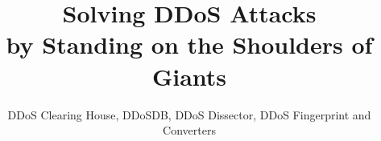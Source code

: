 \documentclass[sigconf,natbib=true]{acmart}
\begin{document}
\title{Solving DDoS Attacks\\by Standing on the Shoulders of Giants}
\subtitle{DDoS Clearing House, DDoSDB, DDoS Dissector, DDoS Fingerprint and Converters}
%





%
\maketitle






%


\end{document}
